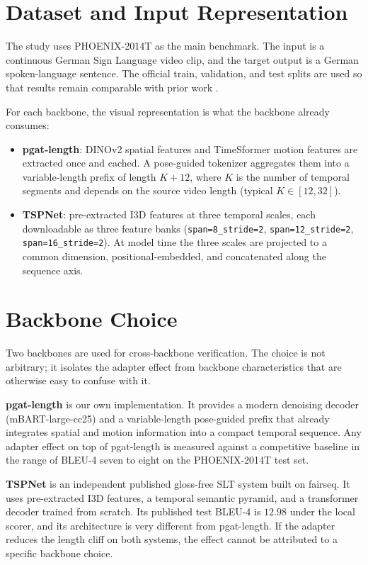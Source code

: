 \section{Dataset and Input Representation}

The study uses PHOENIX-2014T as the main benchmark. The input is a continuous German Sign Language video clip, and the target output is a German spoken-language sentence. The official train, validation, and test splits are used so that results remain comparable with prior work \citep{camgoz2018neural,camgoz2020sign}.

For each backbone, the visual representation is what the backbone already consumes:
\begin{itemize}
    \item \textbf{pgat-length}: DINOv2 spatial features and TimeSformer motion features are extracted once and cached. A pose-guided tokenizer aggregates them into a variable-length prefix of length $K + 12$, where $K$ is the number of temporal segments and depends on the source video length (typical $K \in [12, 32]$).
    \item \textbf{TSPNet}: pre-extracted I3D features at three temporal scales, each downloadable as three feature banks (\texttt{span=8\_stride=2}, \texttt{span=12\_stride=2}, \texttt{span=16\_stride=2}). At model time the three scales are projected to a common dimension, positional-embedded, and concatenated along the sequence axis.
\end{itemize}

\section{Backbone Choice}

Two backbones are used for cross-backbone verification. The choice is not arbitrary; it isolates the adapter effect from backbone characteristics that are otherwise easy to confuse with it.

\textbf{pgat-length} is our own implementation. It provides a modern denoising decoder (mBART-large-cc25) and a variable-length pose-guided prefix that already integrates spatial and motion information into a compact temporal sequence. Any adapter effect on top of pgat-length is measured against a competitive baseline in the range of BLEU-4 seven to eight on the PHOENIX-2014T test set.

\textbf{TSPNet} \citep{li2020tspnet} is an independent published gloss-free SLT system built on fairseq. It uses pre-extracted I3D features, a temporal semantic pyramid, and a transformer decoder trained from scratch. Its published test BLEU-4 is $12.98$ under the local scorer, and its architecture is very different from pgat-length. If the adapter reduces the length cliff on both systems, the effect cannot be attributed to a specific backbone choice.

